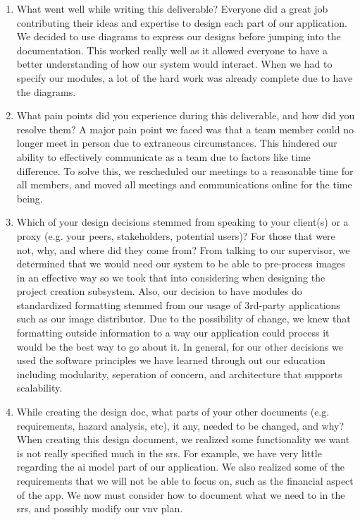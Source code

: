 \documentclass[12pt, titlepage]{article}
\begin{document}


\begin{enumerate}
  \item What went well while writing this deliverable?
  Everyone did a great job contributing their ideas and expertise to design each part of our application. We decided to use diagrams to express our designs before jumping into the documentation. This worked really well as
  it allowed everyone to have a better understanding of how our system would interact. When we had to specify our modules, a lot of the hard work was already complete due to have the diagrams.
  \item What pain points did you experience during this deliverable, and how
    did you resolve them?
    A major pain point we faced was that a team member could no longer meet in person due to extraneous circumstances. This hindered our ability to effectively communicate as a team due to factors like time difference.
    To solve this, we rescheduled our meetings to a reasonable time for all members, and moved all meetings and communications online for the time being.
  \item Which of your design decisions stemmed from speaking to your client(s)
  or a proxy (e.g. your peers, stakeholders, potential users)? For those that
  were not, why, and where did they come from?
  From talking to our supervisor, we determined that we would need our system to be able to pre-process images in an effective way so we took that into considering when designing the project creation subsystem.
  Also, our decision to have modules do standardized formatting stemmed from our usage of 3rd-party applications such as our image distributor. Due to the possibility of change, we knew that formatting outside information to a way our application could process it would be the best way to go about it.
  In general, for our other decisions we used the software principles we have learned through out our education including modularity, seperation of concern, and architecture that supports scalability.
  \item While creating the design doc, what parts of your other documents (e.g.
  requirements, hazard analysis, etc), it any, needed to be changed, and why?
  When creating this design document, we realized some functionality we want is not really specified much in the srs. For example, we have very little regarding the ai model part of our application.
  We also realized some of the requirements that we will not be able to focus on, such as the financial aspect of the app. We now must consider how to document what we need to in the srs, and possibly modify our vnv plan.

\end{enumerate}
\end{document}
